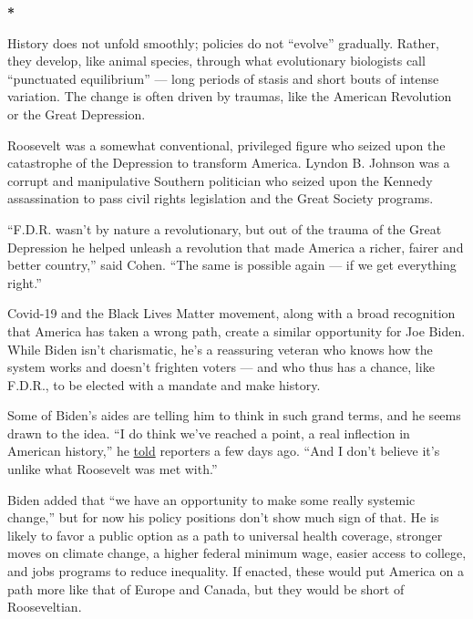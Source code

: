 \textbf{*}

History does not unfold smoothly; policies do not ``evolve'' gradually.
Rather, they develop, like animal species, through what evolutionary
biologists call ``punctuated equilibrium'' --- long periods of stasis
and short bouts of intense variation. The change is often driven by
traumas, like the American Revolution or the Great Depression.

Roosevelt was a somewhat conventional, privileged figure who seized upon
the catastrophe of the Depression to transform America. Lyndon B.
Johnson was a corrupt and manipulative Southern politician who seized
upon the Kennedy assassination to pass civil rights legislation and the
Great Society programs.

``F.D.R. wasn't by nature a revolutionary, but out of the trauma of the
Great Depression he helped unleash a revolution that made America a
richer, fairer and better country,'' said Cohen. ``The same is possible
again --- if we get everything right.''

Covid-19 and the Black Lives Matter movement, along with a broad
recognition that America has taken a wrong path, create a similar
opportunity for Joe Biden. While Biden isn't charismatic, he's a
reassuring veteran who knows how the system works and doesn't frighten
voters --- and who thus has a chance, like F.D.R., to be elected with a
mandate and make history.

Some of Biden's aides are telling him to think in such grand terms, and
he seems drawn to the idea. ``I do think we've reached a point, a real
inflection in American history,'' he
\href{https://messaging-custom-newsletters.nytimes.com/template/oakv2?campaign_id=9\&emc=edit_nn_20200714\&instance_id=20286\&nl=the-morning\&productCode=NN\&regi_id=12554495\&segment_id=33336\&te=1\&uri=nyt\%3A\%2F\%2Fnewsletter\%2Fa6802831-0f40-574e-a8a0-3f5125146b8d\&user_id=a949928698e00ffba23b348eabe9c588}{told}
reporters a few days ago. ``And I don't believe it's unlike what
Roosevelt was met with.''

Biden added that ``we have an opportunity to make some really systemic
change,'' but for now his policy positions don't show much sign of that.
He is likely to favor a public option as a path to universal health
coverage, stronger moves on climate change, a higher federal minimum
wage, easier access to college, and jobs programs to reduce inequality.
If enacted, these would put America on a path more like that of Europe
and Canada, but they would be short of Rooseveltian.

